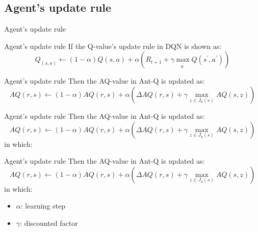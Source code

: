 \documentclass[aspectratio=169,xcolor=dvipsnames]{beamer}
\begin{document}
\subsection{Agent's update rule}
\begin{frame}{Agent's update rule}
\end{frame}

\begin{frame}{Agent's update rule}
    If the Q-value's update rule in DQN is shown as:
    \begin{equation*}
         Q_{\left(s,a\right)} \leftarrow \left( 1-\alpha \right) Q\left( s,a\right)  +\alpha {{\left(R_{t+1}+\gamma \max_{a^{^{\prime }}}Q\left( s^{\prime },a^{\prime }\right) \right) }}
    \end{equation*}
\end{frame}


\begin{frame}{Agent's update rule}
    Then the AQ-value in Ant-Q is updated as:
    \begin{equation*}
        AQ(r,s) \leftarrow (1 - \alpha)AQ(r, s) + \alpha\left(\Delta AQ(r, s) + \gamma \max_{z\in J_k(s)}AQ(s, z)\right)
    \end{equation*}
\end{frame}

\begin{frame}{Agent's update rule}
    Then the AQ-value in Ant-Q is updated as:
    \begin{equation*}
        AQ(r,s) \leftarrow (1 - \alpha)AQ(r, s) + \alpha\left(\Delta AQ(r, s) + \gamma \max_{z\in J_k(s)}AQ(s, z)\right)
    \end{equation*}
    in which:
\end{frame}

\begin{frame}{Agent's update rule}
    Then the AQ-value in Ant-Q is updated as:
    \begin{equation*}
        AQ(r,s) \leftarrow (1 - \alpha)AQ(r, s) + \alpha\left(\Delta AQ(r, s) + \gamma \max_{z\in J_k(s)}AQ(s, z)\right)
    \end{equation*}
    in which:
    \begin{itemize}
        \item $\alpha$: learning step 
        \item $\gamma$: discounted factor
    \end{itemize}
\end{frame}
\end{document}
